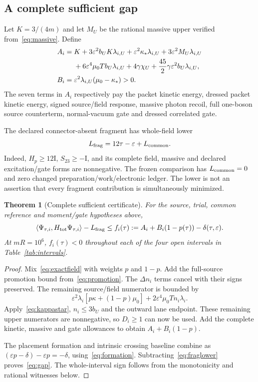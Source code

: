 \documentclass[11pt]{article}
\newtheorem{theorem}{Theorem}[section]
\theoremstyle{definition}
\newcommand{\Id}{\mathrm I}
\newcommand{\eps}{\varepsilon}
\begin{document}
\subsection{A complete sufficient gap}

Let $K=3/(4m)$ and let $M_U$ be the rational massive upper verified from~\eqref{eq:massive}. Define
\begin{align}\label{eq:AB}
 A_i={}&K+3\eps^2b_UK\lambda_{i,U}
       +\eps^2\kappa_*\lambda_{i,U}+3\eps^2M_U\lambda_{i,U}\notag\\
       &+6\eps^4\mu_0Tb_U\lambda_{i,U}
       +4\gamma\chi_U+\frac{45}{2}\gamma\eps^2b_U\lambda_{i,U},\notag\\
 B_i={}&\eps^2\lambda_{i,U}(\mu_0-\kappa_*)>0.
\end{align}
The seven terms in $A_i$ respectively pay the packet kinetic energy, dressed packet kinetic energy, signed source/field response, massive photon recoil, full one-boson source counterterm, normal-vacuum gate and dressed correlated gate.

The declared connector-absent fragment has whole-field lower
\begin{equation}\label{eq:fraglower}
 L_{\rm frag}=12\tau-\eps+L_{\rm common}.
\end{equation}
Indeed, $H_p\geq12\Id$, $S_{23}\geq-\Id$, and its complete field, massive and declared excitation/gate forms are nonnegative. The frozen comparison has $L_{\rm common}=0$ and zero changed preparation/work/electronic ledger. The lower is not an assertion that every fragment contribution is simultaneously minimized.

\begin{theorem}[Complete sufficient certificate]\label{thm:certificate}
For the source, trial, common reference and moment/gate hypotheses above,
\begin{equation}\label{eq:gap}
 \langle\Psi_{\tau,i},H_{\rm tot}\Psi_{\tau,i}\rangle-L_{\rm frag}
 \leq f_i(\tau):=A_i+B_i(1-p(\tau))-\delta(\tau,\eps).
\end{equation}
At $mR=10^6$, $f_i(\tau)<0$ throughout each of the four open intervals in Table~\ref{tab:intervals}.
\end{theorem}

\begin{proof}
Mix~\eqref{eq:exactfield} with weights $p$ and $1-p$. Add the full-source promotion bound from~\eqref{eq:promotion}. The $\Delta n_i$ terms cancel with their signs preserved. The remaining source/field numerator is bounded by
\[
 \eps^2\lambda_i[p\kappa+(1-p)\mu_0]
      +2\eps^4\mu_0Tn_i\lambda_i.
\]
Apply~\eqref{eq:kappastar}, $n_i\leq3b_U$ and the outward lane endpoint. These remaining upper numerators are nonnegative, so $D_i\geq1$ can now be used. Add the complete kinetic, massive and gate allowances to obtain $A_i+B_i(1-p)$.

The placement formation and intrinsic crossing baseline combine as
$(\eps p-\delta)-\eps p=-\delta$, using~\eqref{eq:formation}. Subtracting~\eqref{eq:fraglower} proves~\eqref{eq:gap}. The whole-interval sign follows from the monotonicity and rational witnesses below.
\end{proof}
\end{document}
